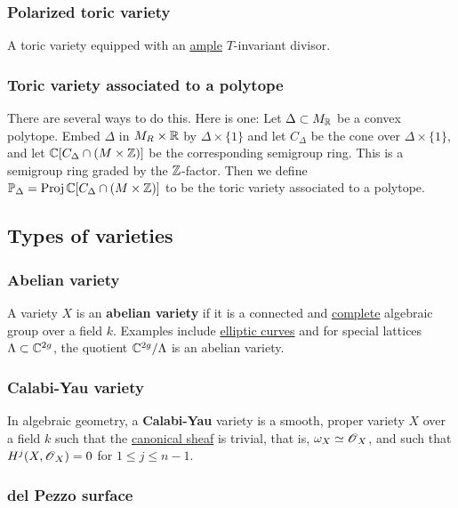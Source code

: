 \documentclass[11pt, english]{article}
\begin{document}
\subsubsection{Polarized toric variety}
A toric variety equipped with an \hyperref[amplelinebundle]{ample} $T$-invariant divisor.

\subsubsection{Toric variety associated to a polytope}

There are several ways to do this. Here is one: Let $\Delta \subset M_{\mathbb{R}}$ be a convex polytope. Embed $\Delta$ in $M_R \times \mathbb{R}$ by $\Delta \times \{1\}$ and let $C_\Delta$ be the cone over $\Delta \times \{ 1\}$, and let $\mathbb{C}[C_\Delta \cap (M \times \mathbb{Z})]$ be the corresponding semigroup ring. This is a semigroup ring graded by the $\mathbb{Z}$-factor. Then we define $\mathbb{P}_\Delta=\operatorname{Proj} \mathbb{C}[C_\Delta \cap (M \times \mathbb{Z})]$ to be the toric variety associated to a polytope.

\subsection{Types of varieties}
\subsubsection{Abelian variety}
\label{abelianvar}

A variety $X$ is an \textbf{abelian variety} if it is a connected and \hyperref[completevariety]{complete} algebraic group over a field $k$. Examples include \hyperref[ellipticc]{elliptic curves} and for special lattices $\Lambda \subset \mathbb{C}^{2g}$, the quotient $\mathbb{C}^{2g}/\Lambda$ is an abelian variety.

\subsubsection{Calabi-Yau variety}

In algebraic geometry, a \textbf{Calabi-Yau} variety is a smooth, proper variety $X$ over a field $k$ such that the \hyperref[canonicaldivisor]{canonical sheaf} is trivial, that is, $\omega_X \simeq \operatorname{\mathscr{O}}_X$, and such that $H^j(X,\operatorname{\mathscr{O}}_X)=0$ for $1 \leq j \leq n-1$. 

\subsubsection{del Pezzo surface}
\label{delpezzo}
\end{document}
